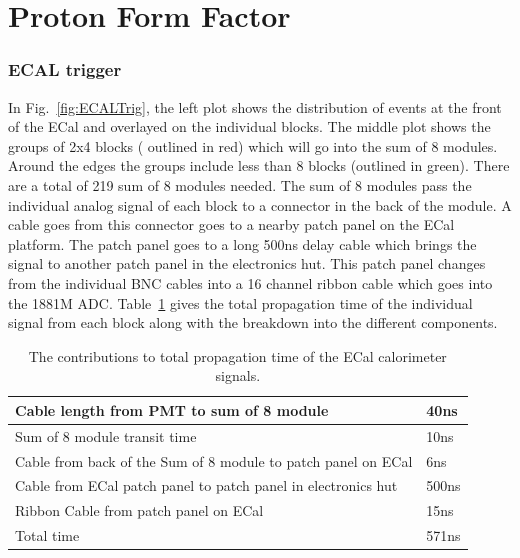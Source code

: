 \documentclass{article}
\begin{document}
\section {Proton Form Factor}

\subsubsection{ECAL trigger}
 \label{sec:ecal-trig}
 In Fig.~\ref{fig:ECALTrig}, the left plot shows the distribution of events at the front of the ECal
 and overlayed on the individual blocks. The middle plot shows the groups of 2x4 blocks ( outlined in red)
 which will go into the sum of 8 modules. Around the edges the groups include less than 8 blocks 
 (outlined in green). There are a total of 219 sum of 8 modules needed.
 The sum of 8 modules pass the individual analog signal of each block to a connector in the
 back of the module. A cable goes from this connector goes to a nearby patch panel on the ECal platform. The patch panel goes to a long 500ns delay cable which brings the signal to
 another patch panel in the electronics hut. This patch panel changes from the individual BNC cables into a 16 channel ribbon cable which goes into the 1881M ADC. 
 Table~\ref{tab:ECALadctime} gives the total propagation time of the individual signal from each block along with the breakdown into the different components.
 \begin{table}[b]
 	\begin{tabular}{|l|l|} \hline
 		Cable length from PMT to sum of 8 module & 40ns \\ \hline
 		Sum of 8 module transit time & 10ns \\ \hline
 		Cable from back of the Sum of 8 module to patch panel on ECal & 6ns \\ \hline
 		Cable from ECal patch panel to patch panel in electronics hut & 500ns \\ \hline
 		Ribbon Cable from patch panel on ECal & 15ns \\ \hline
 		  		Total time & 571ns \\ \hline  		   		  		 		 
 	\end{tabular}
 	\caption{The contributions to total propagation time  of the ECal calorimeter signals.}
 	\label{tab:ECALadctime}
 \end{table}
 
 
 
\end{document}
